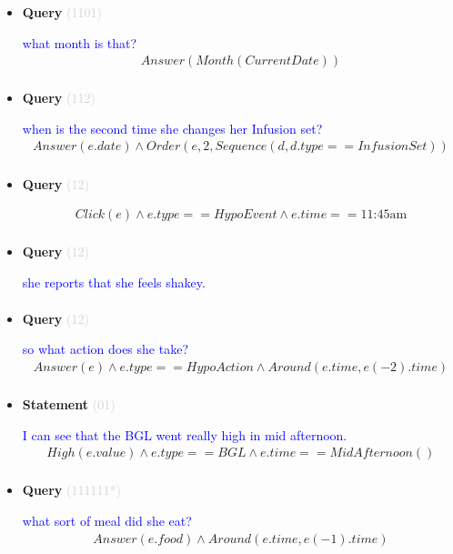 \documentclass[11pt]{article}
\newcommand{\key}[1]{\textcolor{lightgray}{#1}}
\newcounter{CQuery}
\newcounter{CStatement}
\begin{document}
\begin{itemize}
\item
\textbf{Query\theCQuery} \key{(1101)} \addtocounter{CQuery}{1}
\textcolor{blue}{ what month is that? }
\begin{multline*}
Answer(Month(CurrentDate)) \\ 
\end{multline*}


\item
\textbf{Query\theCQuery} \key{(112)} \addtocounter{CQuery}{1}
\textcolor{blue}{ when is the second time she changes her Infusion set? }
\begin{multline*}
Answer(e.date) \wedge Order(e, 2, Sequence(d, d.type==InfusionSet)) \\ 
\end{multline*}


\item
\textbf{Query\theCQuery} \key{(12)} \addtocounter{CQuery}{1}
\textcolor{blue}{  }
\begin{multline*}
Click(e) \wedge e.type == HypoEvent \wedge e.time == \mbox{11:45am} \\ 
\end{multline*}


\item
\textbf{Query\theCQuery} \key{(12)} \addtocounter{CQuery}{1}
\textcolor{blue}{ she reports that she feels shakey. }
\begin{multline*}
\end{multline*}


\item
\textbf{Query\theCQuery} \key{(12)} \addtocounter{CQuery}{1}
\textcolor{blue}{ so what action does she take? }
\begin{multline*}
Answer(e) \wedge e.type == HypoAction \wedge Around(e.time, e(-2).time) \\ 
\end{multline*}


\item
\textbf{Statement\theCStatement} \key{(01)} \addtocounter{CStatement}{1}
\textcolor{blue}{ I can see that the BGL went really high in mid afternoon. }
\begin{multline*}
High(e.value) \wedge e.type==BGL \wedge e.time==MidAfternoon() \\ 
\end{multline*}


\item
\textbf{Query\theCQuery} \key{(111111*)} \addtocounter{CQuery}{1}
\textcolor{blue}{ what sort of meal did she eat? }
\begin{multline*}
Answer(e.food) \wedge Around(e.time, e(-1).time) \\ 
\end{multline*}



\end{itemize}
\end{document}
